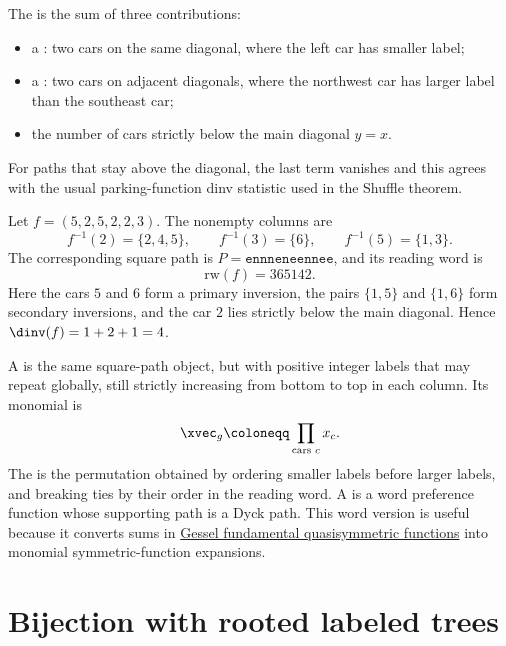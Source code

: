 The \label{preferenceFunctionDinvStatistic} is the sum
of three contributions:
\begin{itemize}
  \item a : two cars on the same diagonal, where the
        left car has smaller label;
  \item a : two cars on adjacent diagonals, where
        the northwest car has larger label than the southeast car;
  \item the number of cars strictly below the main diagonal \(y=x\).
\end{itemize}
For paths that stay above the diagonal, the last term vanishes and this agrees
with the usual parking-function dinv statistic used in the Shuffle theorem.

\begin{example*}
Let \(f=(5,2,5,2,2,3)\).  The nonempty columns are
\[
f^{-1}(2)=\{2,4,5\},\qquad
f^{-1}(3)=\{6\},\qquad
f^{-1}(5)=\{1,3\}.
\]
The corresponding square path is \(P=\mathtt{ennneneennee}\), and its reading
word is
\[
\mathrm{rw}(f)=365142.
\]
Here the cars \(5\) and \(6\) form a primary inversion, the pairs
\(\{1,5\}\) and \(\{1,6\}\) form secondary inversions, and the car \(2\) lies
strictly below the main diagonal.  Hence \(\dinv(f)=1+2+1=4\).
\end{example*}

A \label{wordPreferenceFunctionDefinition}
is the same square-path object, but with positive integer labels that may
repeat globally, still strictly increasing from bottom to top in each column.
Its monomial is
\[
  \xvec_g \coloneqq \prod_{\text{cars } c} x_c.
\]
The 
\label{standardizedReadingWordPreferenceFunction}
is the permutation obtained by ordering smaller labels before larger labels,
and breaking ties by their order in the reading word.
A \label{wordParkingFunctionDefinition}
is a word preference function whose supporting path is a Dyck path.
This word version is useful because it converts sums in
\hyperref[gessel]{Gessel fundamental quasisymmetric functions} into monomial
symmetric-function expansions.


\section[parkingFunctionsLabeledTrees]{Bijection with rooted labeled trees}

